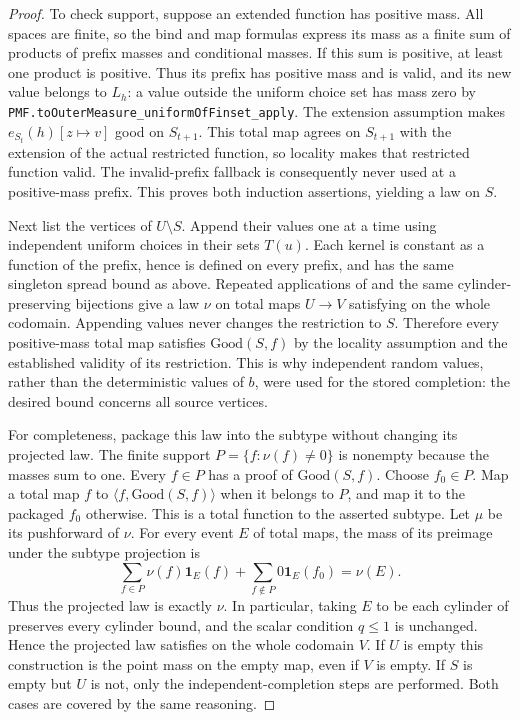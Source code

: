 \begin{proof}
To check support, suppose an extended function has positive mass.
All spaces are finite, so the bind and map formulas express its mass
as a finite sum of products of prefix masses and conditional masses.
If this sum is positive, at least one product is positive. Thus its
prefix has positive mass and is valid, and its new value belongs to
$L_h$: a value outside the uniform choice set has mass zero by
\texttt{PMF.toOuterMeasure\_uniformOfFinset\_apply}. The extension assumption makes
$e_{S_t}(h)[z\mapsto v]$ good on $S_{t+1}$. This total map agrees on
$S_{t+1}$ with the extension of the actual restricted function, so
locality makes that restricted function valid. The invalid-prefix
fallback is consequently never used at a positive-mass prefix.
This proves both induction assertions, yielding a law on $S$.

Next list the vertices of $U\setminus S$. Append their values one at
a time using independent uniform choices in their sets $T(u)$.
Each kernel is constant as a function of the prefix, hence is defined
on every prefix, and has the same singleton spread bound as above.
Repeated applications of  and the
same cylinder-preserving bijections give a law $\nu$ on total maps
$U\to V$ satisfying  on the whole codomain.
Appending values never changes the restriction
to $S$. Therefore every positive-mass total map satisfies
$\mathrm{Good}(S,f)$ by the locality assumption and the established
validity of its restriction. This is why independent random values,
rather than the deterministic values of $b$, were used for the
stored completion: the desired bound concerns all source vertices.

For completeness, package this law into the subtype without changing
its projected law. The finite support
$P=\{f:\nu(f)\ne0\}$ is nonempty because the masses sum to one.
Every $f\in P$ has a proof of $\mathrm{Good}(S,f)$. Choose $f_0\in P$.
Map a total map $f$ to $\langle f,\mathrm{Good}(S,f)\rangle$ when
it belongs to $P$, and map it to the packaged $f_0$ otherwise. This
is a total function to the asserted subtype. Let $\mu$ be its
pushforward of $\nu$. For every event $E$ of total maps, the mass
of its preimage under the subtype projection is
\[
 \sum_{f\in P}\nu(f)\mathbf1_E(f)
       +\sum_{f\notin P}0\mathbf1_E(f_0)=\nu(E).
\]
Thus the projected law is exactly $\nu$. In particular, taking $E$ to
be each cylinder of  preserves every cylinder
bound, and the scalar condition $q\leq1$ is unchanged. Hence the
projected law satisfies  on the whole codomain
$V$. If $U$ is empty this construction is the point mass on
the empty map, even if $V$ is empty. If $S$ is empty but $U$ is not,
only the independent-completion steps are performed. Both cases
are covered by the same reasoning.
\end{proof}
